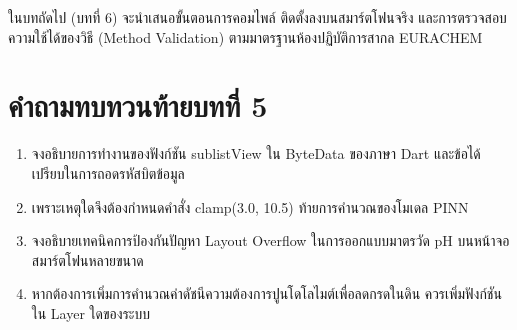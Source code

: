 ในบทถัดไป (บทที่ 6) จะนำเสนอขั้นตอนการคอมไพล์ ติดตั้งลงบนสมาร์ตโฟนจริง และการตรวจสอบความใช้ได้ของวิธี (Method Validation) ตามมาตรฐานห้องปฏิบัติการสากล EURACHEM

\section*{คำถามทบทวนท้ายบทที่ 5}

\begin{enumerate}
    \item จงอธิบายการทำงานของฟังก์ชัน sublistView ใน ByteData ของภาษา Dart และข้อได้เปรียบในการถอดรหัสบิตข้อมูล
    \item เพราะเหตุใดจึงต้องกำหนดคำสั่ง clamp(3.0, 10.5) ท้ายการคำนวณของโมเดล PINN
    \item จงอธิบายเทคนิคการป้องกันปัญหา Layout Overflow ในการออกแบบมาตรวัด pH บนหน้าจอสมาร์ตโฟนหลายขนาด
    \item หากต้องการเพิ่มการคำนวณค่าดัชนีความต้องการปูนโดโลไมต์เพื่อลดกรดในดิน ควรเพิ่มฟังก์ชันใน Layer ใดของระบบ
\end{enumerate}
